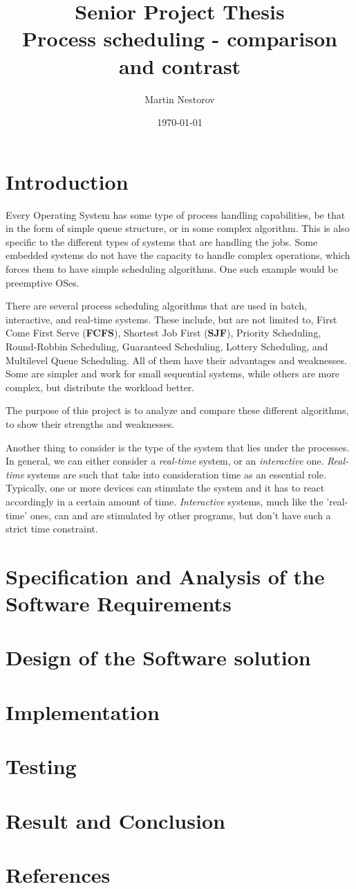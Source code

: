 \documentclass{article}
\title{Senior Project Thesis\\
       \large Process scheduling - comparison and contrast}
\date{\today}
\author{Martin Nestorov}
\begin{document}
\maketitle
{}

\newpage

\section{Introduction}

Every Operating System has some type of process handling capabilities, be that in the form of simple queue structure, or in some complex algorithm. This is also specific to the different types of systems that are handling the jobs. Some embedded systems do not have the capacity to handle complex operations, which forces them to have simple scheduling algorithms. One such example would be preemptive OSes.

There are several process scheduling algorithms that are used in batch, interactive, and real-time systems. These include, but are not limited to, First Come First Serve (\textbf{FCFS}), Shortest Job First (\textbf{SJF}), Priority Scheduling, Round-Robbin Scheduling, Guaranteed Scheduling, Lottery Scheduling, and Multilevel Queue Scheduling. All of them have their advantages and weaknesses. Some are simpler and work for small sequential systems, while others are more complex, but distribute the workload better.

The purpose of this project is to analyze and compare these different algorithms, to show their strengths and weaknesses.

Another thing to consider is the type of the system that lies under the processes. In general, we can either consider a \textit{real-time} system, or an \textit{interactive} one. \textit{Real-time} systems are such that take into consideration time as an essential role. Typically, one or more devices can stimulate the system and it has to react accordingly in a certain amount of time. \textit{Interactive} systems, much like the 'real-time' ones, can and are stimulated by other programs, but don't have such a strict time constraint.

\section{Specification and Analysis of the Software Requirements}

\section{Design of the Software solution}

\section{Implementation}

\section{Testing}

\section{Result and Conclusion}

\section{References}
\end{document}
